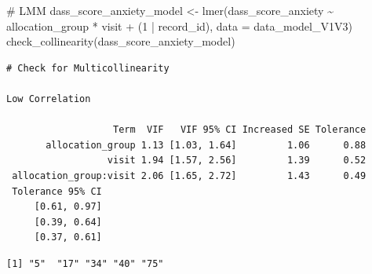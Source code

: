\documentclass[
  letterpaper,
  DIV=11,
  numbers=noendperiod]{scrartcl}
\newenvironment{Shaded}{\begin{snugshade}}{\end{snugshade}}
\newcommand{\AttributeTok}[1]{\textcolor[rgb]{0.40,0.45,0.13}{#1}}
\newcommand{\CommentTok}[1]{\textcolor[rgb]{0.37,0.37,0.37}{#1}}
\newcommand{\DecValTok}[1]{\textcolor[rgb]{0.68,0.00,0.00}{#1}}
\newcommand{\FunctionTok}[1]{\textcolor[rgb]{0.28,0.35,0.67}{#1}}
\newcommand{\NormalTok}[1]{\textcolor[rgb]{0.00,0.23,0.31}{#1}}
\newcommand{\OtherTok}[1]{\textcolor[rgb]{0.00,0.23,0.31}{#1}}
\newcommand{\SpecialCharTok}[1]{\textcolor[rgb]{0.37,0.37,0.37}{#1}}
\newcommand{\StringTok}[1]{\textcolor[rgb]{0.13,0.47,0.30}{#1}}
\begin{document}
\begin{Shaded}
\begin{Highlighting}[]
\CommentTok{\# LMM}
\NormalTok{dass\_score\_anxiety\_model }\OtherTok{\textless{}{-}} \FunctionTok{lmer}\NormalTok{(dass\_score\_anxiety }\SpecialCharTok{\textasciitilde{}}\NormalTok{ allocation\_group }\SpecialCharTok{*}\NormalTok{ visit }\SpecialCharTok{+}\NormalTok{ (}\DecValTok{1} \SpecialCharTok{|}\NormalTok{ record\_id), }\AttributeTok{data =}\NormalTok{ data\_model\_V1V3)}
\FunctionTok{check\_collinearity}\NormalTok{(dass\_score\_anxiety\_model)}
\end{Highlighting}
\end{Shaded}

\begin{verbatim}
# Check for Multicollinearity

Low Correlation

                   Term  VIF   VIF 95% CI Increased SE Tolerance
       allocation_group 1.13 [1.03, 1.64]         1.06      0.88
                  visit 1.94 [1.57, 2.56]         1.39      0.52
 allocation_group:visit 2.06 [1.65, 2.72]         1.43      0.49
 Tolerance 95% CI
     [0.61, 0.97]
     [0.39, 0.64]
     [0.37, 0.61]
\end{verbatim}

\begin{Shaded}
\end{Shaded}

\begin{verbatim}
[1] "5"  "17" "34" "40" "75"
\end{verbatim}
\end{document}
